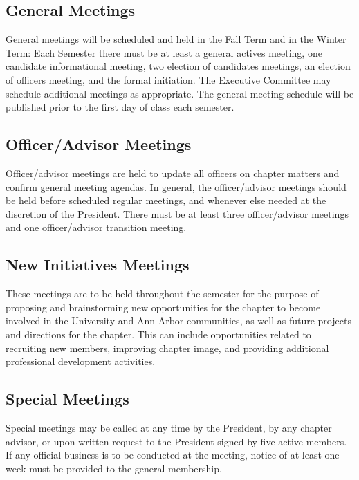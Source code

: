 \subsection{General Meetings} \label{V.1}

General meetings will be scheduled and held in the
Fall Term and in the Winter Term: Each Semester there must be at least a general actives
meeting, one candidate informational meeting, two election of candidates meetings,
an election of officers meeting, and the formal initiation. The Executive Committee may
schedule additional meetings as appropriate. The general meeting schedule will be published
prior to the first day of class each semester.


\subsection{Officer/Advisor Meetings} \label{V.2}

Officer/advisor meetings are held to update
all officers on chapter matters and confirm general meeting agendas. In general, the
officer/advisor meetings should be held before scheduled regular meetings, and whenever
else needed at the discretion of the President. There must be at least three officer/advisor
meetings and one officer/advisor transition meeting.


\subsection{New Initiatives Meetings} \label{V.3}

These meetings are to be held throughout
the semester for the purpose of proposing and brainstorming new opportunities for the
chapter to become involved in the University and Ann Arbor communities, as well as
future projects and directions for the chapter. This can include opportunities related to
recruiting new members, improving chapter image, and providing additional professional
development activities.


\subsection{Special Meetings} \label{V.4}

Special meetings may be called at any time by the
President, by any chapter advisor, or upon written request to the President signed by five
active members. If any official business is to be conducted at the meeting, notice of at least
one week must be provided to the general membership.